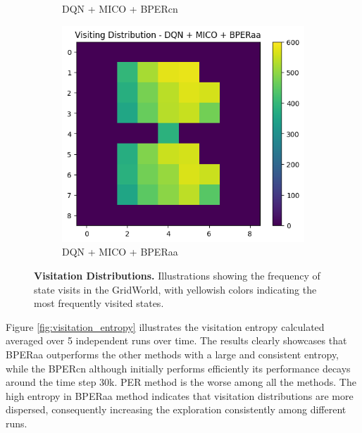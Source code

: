 \begin{figure}[H]
\begin{subfigure}{0.32\textwidth}
        \caption{DQN + MICO + BPERcn}
        \label{fig:visitation_distributions_bpercn}
    \end{subfigure}
    \hfill
    \begin{subfigure}{0.32\textwidth}
        \centering
        \includegraphics[width=\linewidth]{Results/grid_world/visitation_distribution_dqn_mico_bperaa.png}
        \caption{DQN + MICO + BPERaa}
        \label{fig:visitation_distributions_bperaa}
    \end{subfigure}
    \caption[Visitation Distributions]{\textbf{Visitation Distributions.} Illustrations showing the frequency of state visits in the GridWorld, with yellowish colors indicating the most frequently visited states.}
    \label{fig:visitation_distributions}
\end{figure}

Figure \ref{fig:visitation_entropy} illustrates the visitation entropy calculated averaged over 5 independent runs over time. The results clearly showcases that BPERaa outperforms the other methods with a large and consistent entropy, while the BPERcn although initially performs efficiently its performance decays around the time step 30k. PER method is the worse among all the methods. The high entropy in BPERaa method indicates that visitation distributions are more dispersed, consequently increasing the exploration consistently among different runs.

